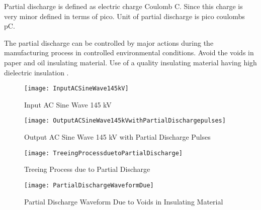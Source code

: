 Partial discharge is defined as electric charge Coulomb C. Since this charge is very minor defined in terms of pico. Unit of partial discharge is pico coulombs pC.

The partial discharge can be controlled by major actions during the manufacturing process in controlled environmental conditions. Avoid the voids in paper and oil insulating material. Use of a quality insulating material having high dielectric insulation \setlength{\parskip}{0em}\cite{satish1994artificial}.

\begin{figure}[h!]
    \centering
    \texttt{[image: InputACSineWave145kV]}
    \caption{Input AC Sine Wave 145 kV}
    \label{fig:Input AC Sine Wave 145 kV}
\end{figure}

\begin{figure}[h!]
    \centering
    \texttt{[image: OutputACSineWave145kVwithPartialDischargepulses]}
    \caption{Output AC Sine Wave 145 kV with Partial Discharge Pulses}
    \label{fig:Output AC Sine Wave 145 kV with Partial Discharge Pulses}
\end{figure}

\begin{figure}[h!]
    \centering
    \texttt{[image: TreeingProcessduetoPartialDischarge]}
    \caption{Treeing Process  due to Partial Discharge}
    \label{fig:Treeing Process  due to Partial Discharge}
\end{figure}

\begin{figure}[h!]
    \centering
    \texttt{[image: PartialDischargeWaveformDue]}
    \caption{Partial Discharge Waveform Due to Voids in Insulating Material}
    \label{fig:Partial Discharge Waveform Due to Voids in Insulating Material}
\end{figure}

